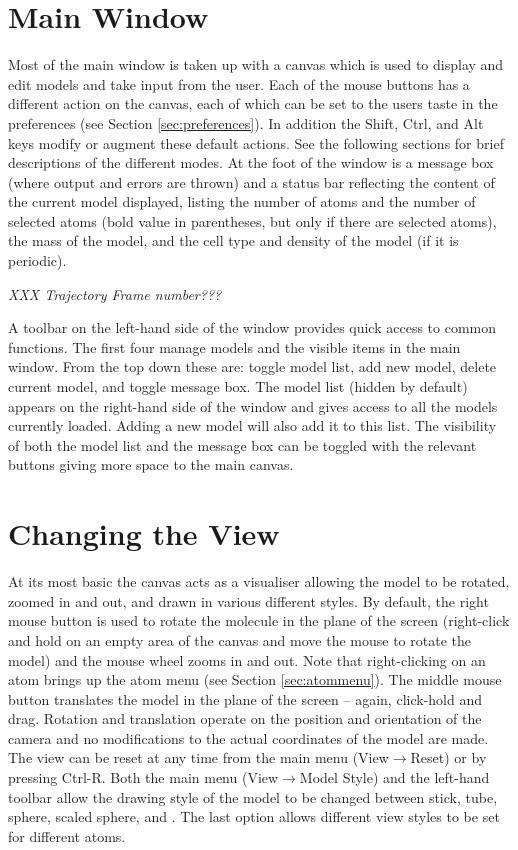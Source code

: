 \section{Main Window}
Most of the main window is taken up with a canvas which is used to display and edit models and take input from the user. Each of the mouse buttons has a different action on the canvas, each of which can be set to the users taste in the preferences (see Section \ref{sec:preferences}). In addition the Shift, Ctrl, and Alt keys modify or augment these default actions. See the following sections for brief descriptions of the different modes. At the foot of the window is a message box (where output and errors are thrown) and a status bar reflecting the content of the current model displayed, listing the number of atoms and the number of selected atoms (bold value in parentheses, but only if there are selected atoms), the mass of the model, and the cell type and density of the model (if it is periodic).

{\it XXX Trajectory Frame number???}

A toolbar on the left-hand side of the window provides quick access to common functions. The first four manage models and the visible items in the main window. From the top down these are: toggle model list, add new model, delete current model, and toggle message box. The model list (hidden by default) appears on the right-hand side of the window and gives access to all the models currently loaded. Adding a new model will also add it to this list. The visibility of both the model list and the message box can be toggled with the relevant buttons giving more space to the main canvas.

\section{Changing the View}
At its most basic the canvas acts as a visualiser allowing the model to be rotated, zoomed in and out, and drawn in various different styles. By default, the right mouse button is used to rotate the molecule in the plane of the screen (right-click and hold on an empty area of the canvas and move the mouse to rotate the model) and the mouse wheel zooms in and out. Note that right-clicking on an atom brings up the atom menu (see Section \ref{sec:atommenu}). The middle mouse button translates the model in the plane of the screen -- again, click-hold and drag. Rotation and translation operate on the position and orientation of the camera and no modifications to the actual coordinates of the model are made. The view can be reset at any time from the main menu (View$\rightarrow$Reset) or by pressing Ctrl-R. Both the main menu (View$\rightarrow$Model Style) and the left-hand toolbar allow the drawing style of the model to be changed between stick, tube, sphere, scaled sphere, and . The last option allows different view styles to be set for different atoms.\\

